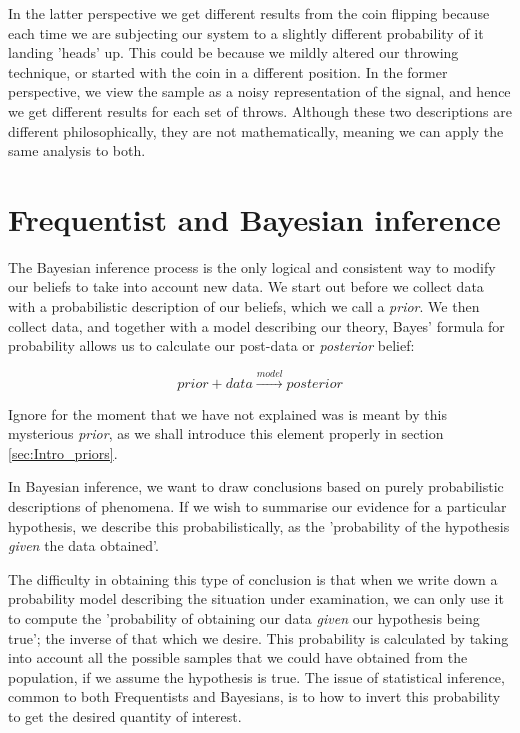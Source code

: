 \documentclass[11pt,fullpage]{book}
\begin{document}
In the latter perspective we get different results from the coin flipping because each time we are subjecting our system to a slightly different probability of it landing 'heads' up. This could be because we mildly altered our throwing technique, or started with the coin in a different position. In the former perspective, we view the sample as a noisy representation of the signal, and hence we get different results for each set of throws. Although these two descriptions are different philosophically, they are not mathematically, meaning we can apply the same analysis to both.

\section{Frequentist and Bayesian inference}
The Bayesian inference process is the only logical and consistent way to modify our beliefs to take into account new data. We start out before we collect data with a probabilistic description of our beliefs, which we call a \textit{prior}. We then collect data, and together with a model describing our theory, Bayes' formula for probability allows us to calculate our post-data or \textit{posterior} belief:

\begin{equation}
prior + data \xrightarrow{model} posterior
\end{equation}

Ignore for the moment that we have not explained was is meant by this mysterious \textit{prior}, as we shall introduce this element properly in section \ref{sec:Intro_priors}. 

In Bayesian inference, we want to draw conclusions based on purely probabilistic descriptions of phenomena. If we wish to summarise our evidence for a particular hypothesis, we describe this probabilistically, as the 'probability of the hypothesis \textit{given} the data obtained'. 

The difficulty in obtaining this type of conclusion is that when we write down a probability model describing the situation under examination, we can only use it to compute the 'probability of obtaining our data \textit{given} our hypothesis being true'; the inverse of that which we desire. This probability is calculated by taking into account all the possible samples that we could have obtained from the population, if we assume the hypothesis is true. The issue of statistical inference, common to both Frequentists and Bayesians, is to how to invert this probability to get the desired quantity of interest.
\end{document}

